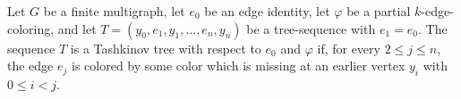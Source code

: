 \begin{definition}
Let $G$ be a finite multigraph, let $e_0$ be an edge identity, let
$\varphi$ be a partial $k$-edge-coloring, and let
$T=(y_0,e_1,y_1,\ldots,e_n,y_n)$ be a tree-sequence with $e_1=e_0$.
The sequence $T$ is a Tashkinov tree with respect to $e_0$ and $\varphi$
if, for every $2\leq j\leq n$, the edge $e_j$ is colored by some color
which is missing at an earlier vertex $y_i$ with $0\leq i<j$.
\end{definition}
